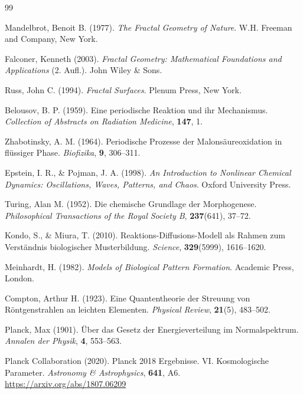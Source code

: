 \begin{thebibliography}{99}
	
	Mandelbrot, Benoit B. (1977). \textit{The Fractal Geometry of Nature}. 
	W.H. Freeman and Company, New York.
	
	Falconer, Kenneth (2003). \textit{Fractal Geometry: Mathematical Foundations and Applications} (2. Aufl.). 
	John Wiley \& Sons.
	
	Russ, John C. (1994). \textit{Fractal Surfaces}. 
	Plenum Press, New York.
	
	Belousov, B. P. (1959). Eine periodische Reaktion und ihr Mechanismus. 
	\textit{Collection of Abstracts on Radiation Medicine}, \textbf{147}, 1.
	
	Zhabotinsky, A. M. (1964). Periodische Prozesse der Malonsäureoxidation in flüssiger Phase. 
	\textit{Biofizika}, \textbf{9}, 306--311.
	
	Epstein, I. R., \& Pojman, J. A. (1998). \textit{An Introduction to Nonlinear Chemical Dynamics: Oscillations, Waves, Patterns, and Chaos}. 
	Oxford University Press.
	
	Turing, Alan M. (1952). Die chemische Grundlage der Morphogenese. 
	\textit{Philosophical Transactions of the Royal Society B}, \textbf{237}(641), 37--72.
	
	Kondo, S., \& Miura, T. (2010). Reaktions-Diffusions-Modell als Rahmen zum Verständnis biologischer Musterbildung. 
	\textit{Science}, \textbf{329}(5999), 1616--1620.
	
	Meinhardt, H. (1982). \textit{Models of Biological Pattern Formation}. 
	Academic Press, London.
	
	Compton, Arthur H. (1923). Eine Quantentheorie der Streuung von Röntgenstrahlen an leichten Elementen. 
	\textit{Physical Review}, \textbf{21}(5), 483--502.
	
	Planck, Max (1901). Über das Gesetz der Energieverteilung im Normalspektrum. 
	\textit{Annalen der Physik}, \textbf{4}, 553--563.
	
	Planck Collaboration (2020). Planck 2018 Ergebnisse. VI. Kosmologische Parameter. 
	\textit{Astronomy \& Astrophysics}, \textbf{641}, A6.
	\href{https://arxiv.org/abs/1807.06209}{https://arxiv.org/abs/1807.06209}
	

\end{thebibliography}
